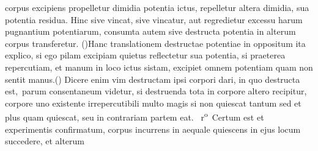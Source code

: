 corpus excipiens\protect{} propelletur dimidia potentia ictus,\protect{}
repelletur altera dimidia, 
sua potentia\protect{} residua. Hinc
sive vincat, sive vincatur,
aut regredietur
excessu\protect{} harum pugnantium potentiarum, consumta autem sive 
destructa potentia\protect{} in alterum corpus transferetur.
%
\pend 
%
\pstart
(\protect\vphantom)Hanc translationem\protect{} destructae potentiae\protect{} in oppositum ita explico,
%
si ego pilam\protect{} excipiam quietus reflectetur sua potentia\protect{},
%
si praeterea repercutiam, et manum in loco ictus\protect{} sistam, excipiet
omnem potentiam\protect{} quam non sentit manus.\protect\vphantom() 
%
\pend
%
\pstart
Dicere enim vim destructam%
\protect{} ipsi corpori dari, in quo destructa est\lbrack,\rbrack\ parum consentaneum videtur, si
destruenda tota in corpore altero recipitur, corpore uno existente irrepercutibili multo
magis si non quiescat tantum sed et plus quam quiescat, seu
in contrariam partem eat.
%
\pend \pstart
%
~r\textsuperscript{o}\rbrack\ Certum est et experimentis\protect{} confirmatum, 
%
corpus incurrens in aequale quiescens
\protect{} in ejus locum succedere,
%
et alterum 
%
%
%
